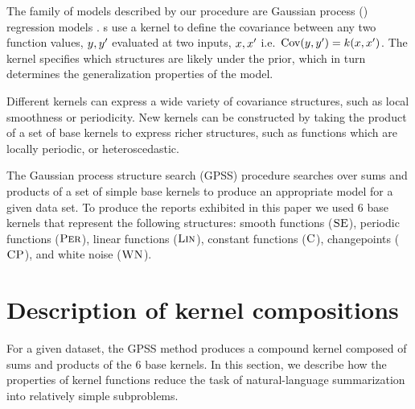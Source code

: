 \documentclass{article} %
\def\ie{i.e.\ }
\begin{document}
The family of models described by our procedure are Gaussian process (\gp{}) regression models \cite{rasmussen38gaussian}.
%
\gp{}s use a kernel to define the covariance between any two function values, $y, y'$ evaluated at two inputs, $x,x'$ \ie ${\textrm{Cov}(y, y') = k(x,x')}$.
The kernel specifies which structures are likely under the \gp{} prior, which in turn determines the generalization properties of the model.

Different kernels can express a wide variety of covariance structures, such as local smoothness or periodicity.
New kernels can be constructed by taking the product of a set of base kernels to express richer structures, such as functions which are locally periodic, or heteroscedastic.

The Gaussian process structure search (GPSS) procedure \citep{DuvLloGroetal13} searches over sums and products of a set of simple base kernels to produce an appropriate model for a given data set.
To produce the reports exhibited in this paper we used 6 base kernels that represent the following structures: smooth functions (${\textsc{SE}}$), periodic functions (${\textsc{Per}}$), linear functions (${\textsc{Lin}}$), constant functions (${\textsc{C}}$), changepoints (${\textsc{CP}}$), and white noise (${\textsc{WN}}$).



\section{Description of kernel compositions}
\vspace{-0.08in}

For a given dataset, the GPSS method produces a compound kernel composed of sums and products of the 6 base kernels.
In this section, we describe how the properties of kernel functions reduce the task of natural-language summarization into relatively simple subproblems.

\end{document}
